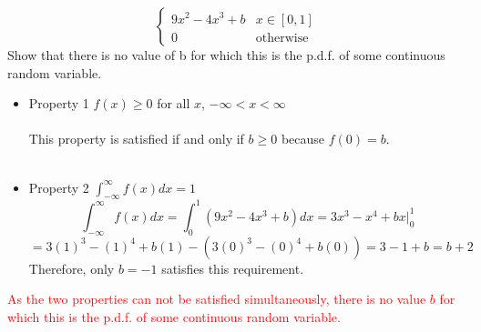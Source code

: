 \documentclass{article}
\begin{document}
\begin{enumerate}
\[\begin{cases}
        9x^2 - 4x^3 + b & x \in [0, 1]\\
        0 & \text{otherwise}
    \end{cases}
    \]
    Show that there is no value of b for which this is the p.d.f. of some continuous random variable.
    \begin{itemize}
            \item[]Property 1 $f(x) \geq 0$ for all $x$, $-\infty < x < \infty$\\\\
            This property is satisfied if and only if $b \geq 0$ because $f(0) = b$.\\\\
            \item[]Property 2 $\int_{-\infty}^{\infty}f(x)dx=1$
            \[\int_{-\infty}^{\infty}f(x)dx
            =\int_{0}^{1}(9x^2 - 4x^3 + b)dx
            =3x^3-x^4+bx\Big|_{0}^{1}
            \]
            \[
            =3(1)^3-(1)^4+b(1)-(3(0)^3-(0)^4+b(0))=3-1+b=b+2
            \]
            Therefore, only $b=-1$ satisfies this requirement.
        \end{itemize}
    \textcolor{red}{As the two properties can not be satisfied simultaneously, there is no value $b$ for which this is the p.d.f. of some continuous random variable.}
    
\end{enumerate}
\end{document}
